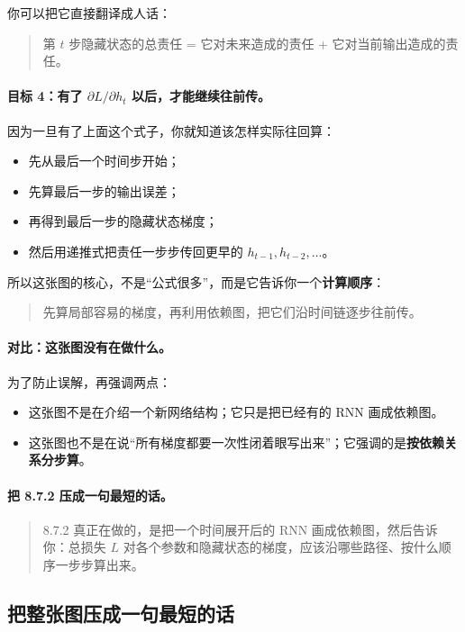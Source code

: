 \documentclass[12pt,a4paper]{ctexart}
\begin{document}
你可以把它直接翻译成人话：
\begin{quote}
第 \(t\) 步隐藏状态的总责任 = 它对未来造成的责任 + 它对当前输出造成的责任。
\end{quote}

\paragraph{目标 4：有了 \(\partial L/\partial h_t\) 以后，才能继续往前传。}
因为一旦有了上面这个式子，你就知道该怎样实际往回算：
\begin{itemize}
  \item 先从最后一个时间步开始；
  \item 先算最后一步的输出误差；
  \item 再得到最后一步的隐藏状态梯度；
  \item 然后用递推式把责任一步步传回更早的 \(h_{t-1}, h_{t-2}, \ldots\)。
\end{itemize}

所以这张图的核心，不是“公式很多”，而是它告诉你一个\textbf{计算顺序}：
\begin{quote}
先算局部容易的梯度，再利用依赖图，把它们沿时间链逐步往前传。
\end{quote}

\paragraph{对比：这张图没有在做什么。}
为了防止误解，再强调两点：
\begin{itemize}
  \item 这张图不是在介绍一个新网络结构；它只是把已经有的 RNN 画成依赖图。
  \item 这张图也不是在说“所有梯度都要一次性闭着眼写出来”；它强调的是\textbf{按依赖关系分步算}。
\end{itemize}

\paragraph{把 8.7.2 压成一句最短的话。}
\begin{quote}
8.7.2 真正在做的，是把一个时间展开后的 RNN 画成依赖图，然后告诉你：总损失 \(L\) 对各个参数和隐藏状态的梯度，应该沿哪些路径、按什么顺序一步步算出来。
\end{quote}

\subsection{把整张图压成一句最短的话}
\end{document}
